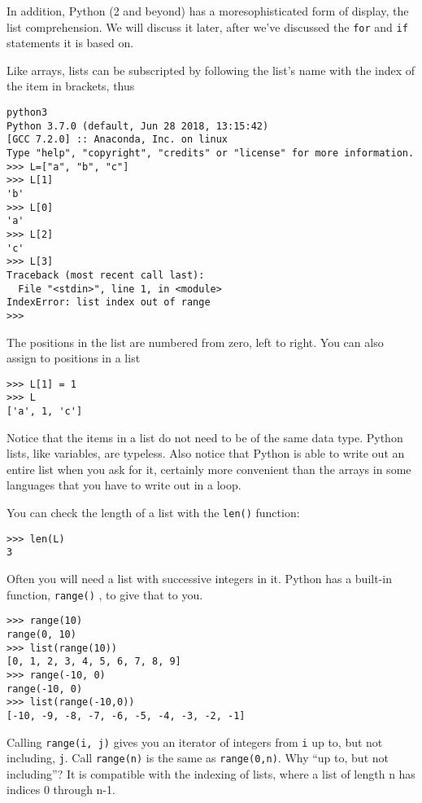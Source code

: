 In addition, Python (2 and beyond) has a moresophisticated form of display, the list comprehension. 
We will discuss it later, after we've discussed the \texttt{for} and \texttt{if}
statements it is based on.

Like arrays, lists can be subscripted by following the list's name with the index of the item in
brackets, thus

\begin{verbatim}
python3
Python 3.7.0 (default, Jun 28 2018, 13:15:42) 
[GCC 7.2.0] :: Anaconda, Inc. on linux
Type "help", "copyright", "credits" or "license" for more information.
>>> L=["a", "b", "c"]
>>> L[1]
'b'
>>> L[0]
'a'
>>> L[2]
'c'
>>> L[3]
Traceback (most recent call last):
  File "<stdin>", line 1, in <module>
IndexError: list index out of range
>>> 
\end{verbatim}

The positions in the list are numbered from zero, left to right. You can also assign to positions in a
list

\begin{verbatim}
>>> L[1] = 1
>>> L
['a', 1, 'c']
\end{verbatim}

Notice that the items in a list do
not need to be of the same data type. Python lists, like variables, are
typeless. Also notice that Python is able to write out an entire list
when you ask for it, certainly more convenient than the arrays in some
languages that you have to write out in a loop.

You can check the length of a list
with the \texttt{len()} function:

\begin{verbatim}
>>> len(L)
3
\end{verbatim}

Often you will need a list with
successive integers in it. Python has a built-in function,
\texttt{range()} , to give that to you.

\begin{verbatim}
>>> range(10)
range(0, 10)
>>> list(range(10))
[0, 1, 2, 3, 4, 5, 6, 7, 8, 9]
>>> range(-10, 0)
range(-10, 0)
>>> list(range(-10,0))
[-10, -9, -8, -7, -6, -5, -4, -3, -2, -1]
\end{verbatim}


Calling \texttt{range(i, j)} gives you an iterator of integers 
from \texttt{i} up to, but not including,
\texttt{j}. Call \texttt{range(n)} is the same as \texttt{range(0,n)}. Why
``up to, but not including''? It is compatible with the indexing of
lists, where a list of length n has indices 0 through n-1.

